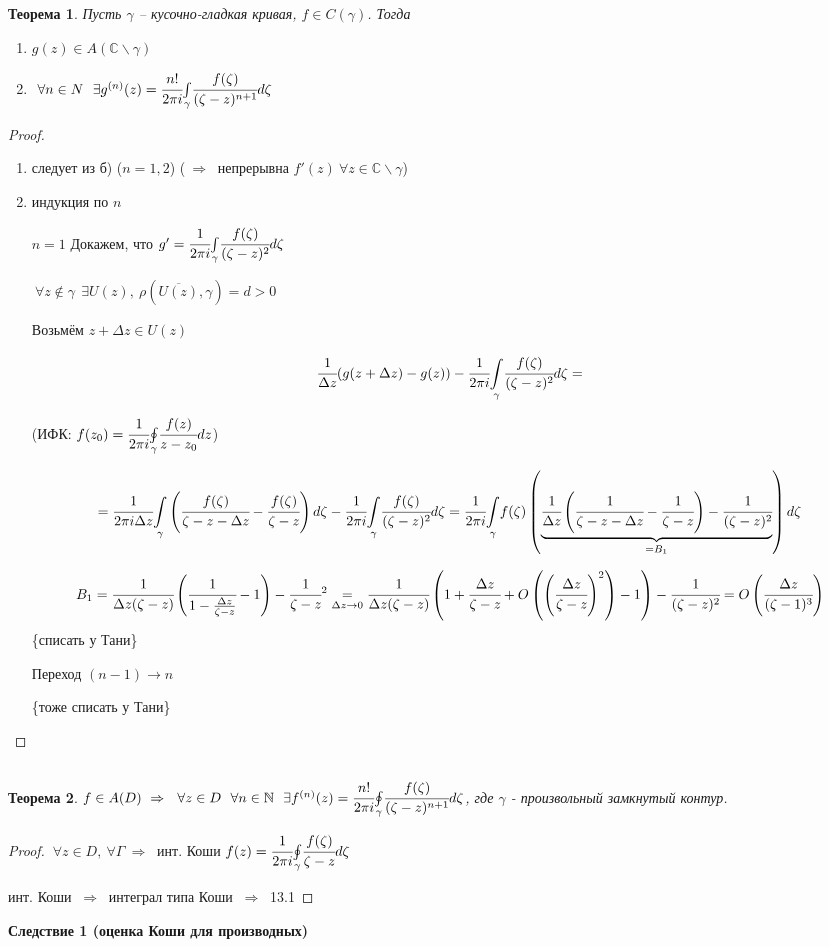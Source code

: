 \documentclass[draft]{report}
\newcommand{\forcenewline}{$\phantom{\mbox{newline}}$}
\newcommand{\then}{\ \Rightarrow\ }
\renewcommand{\C}{\mathbb{C}}
\newcommand{\N}{\mathbb{N}}
\newcommand{\mint}[2]{\underset{#1}{\overset{#2}{\int}}}
\newcommand{\moint}[1]{\underset{#1}{\oint}}
\newcommand{\g}{\gamma}
\newcommand{\G}{\Gamma}
\newcommand{\D}{\Delta}
\newcommand{\E}{\ \exists}
\newcommand{\F}{\ \forall}
\newtheorem*{theor}{Теорема}
\theoremstyle{remark}
\begin{document}
\begin{theor}
Пусть $\g$ -- кусочно-гладкая кривая, $f\in C(\g)$. Тогда
\begin{enumerate}
\item[а)] $g(z)\in A(\C\smallsetminus\g)$
\item[б)] $\F n\in N\ \E g^{(n)}(z)=\cfrac{n!}{2\pi i}\mint{\g}{}\cfrac{f(\zeta)}{(\zeta-z)^{n+1}}d\zeta$
\end{enumerate}
\end{theor}
\begin{proof}
\forcenewline
\begin{enumerate}
\item[а)] следует из б) ($n=1,2$) ($\then$ непрерывна $f'(z)\F z\in \C\smallsetminus\g$)
\item[б)] индукция по $n$

$n=1$ Докажем, что $g'=\cfrac{1}{2\pi i}\mint{\g}{}\cfrac{f(\zeta)}{(\zeta-z)^{2}}d\zeta$

$\F z\notin\g\ \E U(z),\ \rho(\overline{U(z)},\g)=d>0$

Возьмём $z+\D z\in U(z)$

$$\cfrac1{\D z}(g(z+\D z)-g(z))-\cfrac{1}{2\pi i}\mint{\g}{}\cfrac{f(\zeta)}{(\zeta-z)^{2}}d\zeta=$$

(ИФК: $f(z_0)=\cfrac{1}{2\pi i}\moint{\g}{}\cfrac{f(z)}{z-z_0}dz$)

$$=\cfrac1{2\pi i\D z}\mint{\g}{}\left(\cfrac{f(\zeta)}{\zeta-z-\D z}-\cfrac{f(\zeta)}{\zeta-z}\right)d\zeta-\cfrac{1}{2\pi i}\mint{\g}{}\cfrac{f(\zeta)}{(\zeta-z)^{2}}d\zeta=\cfrac1{2\pi i}\mint{\g}{}f(\zeta)\left(\underset{=B_1}{\underbrace{\cfrac1{\D z}\left(\cfrac1{\zeta-z-\D z}-\cfrac1{\zeta-z}\right)-\cfrac1{(\zeta-z)^2}}}\right)d\zeta$$

$$B_1=\cfrac1{\D z(\zeta-z)}\left(\cfrac1{1-\frac{\D z}{\zeta-z}}-1\right)-\cfrac1{\zeta-z}^2\underset{\D z\to 0}{=}\cfrac1{\D z(\zeta-z)}\left(1+\cfrac{\D z}{\zeta-z}+O\left(\left(\cfrac{\D z}{\zeta-z}\right)^2\right)-1\right)-\cfrac1{(\zeta-z)^2}=O\left(\cfrac{\D z}{(\zeta-1)^3}\right)$$
\{списать у Тани\}

Переход $(n-1)\to n$

\{тоже списать у Тани\}
\end{enumerate}
\end{proof}

\subsection{}

\begin{theor}
$f\in A(D)\then \F z\in D\ \F n\in\N\ \E f^{(n)}(z)=\cfrac{n!}{2\pi i}\moint{\g}\cfrac{f(\zeta)}{(\zeta-z)^{n+1}}d\zeta$, где $\g$ - произвольный замкнутый контур.
\end{theor}
\begin{proof}
$\F z\in D,\F \G \then$ инт. Коши $f(z)=\cfrac{1}{2\pi i}\moint{\g}\cfrac{f(\zeta)}{\zeta-z}d\zeta$

инт. Коши $\then$ интеграл типа Коши $\then$ 13.1
\end{proof}
{\bfseries Следствие 1 (оценка Коши для производных)}
\end{document}
